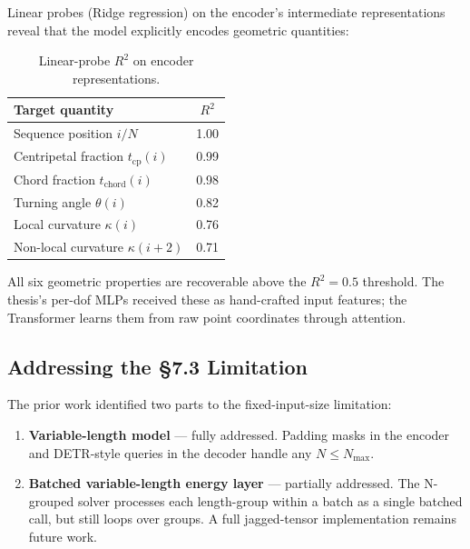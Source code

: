 \documentclass[11pt, a4paper]{article}
\begin{document}
Linear probes (Ridge regression) on the encoder's intermediate
representations reveal that the model explicitly encodes geometric
quantities:

\begin{table}[h]
\centering
\caption{Linear-probe $R^2$ on encoder representations.}
\label{tab:probing}
\begin{tabular}{lc}
\toprule
\textbf{Target quantity} & $R^2$ \\
\midrule
Sequence position $i/N$ & 1.00 \\
Centripetal fraction $t_{\text{cp}}(i)$ & 0.99 \\
Chord fraction $t_{\text{chord}}(i)$ & 0.98 \\
Turning angle $\theta(i)$ & 0.82 \\
Local curvature $\kappa(i)$ & 0.76 \\
Non-local curvature $\kappa(i{+}2)$ & 0.71 \\
\bottomrule
\end{tabular}
\end{table}

All six geometric properties are recoverable above the $R^2 = 0.5$
threshold. The thesis's per-dof MLPs received these as hand-crafted input
features; the Transformer learns them from raw point coordinates through
attention.


\subsection{Addressing the §7.3 Limitation}

The prior work identified two parts to the fixed-input-size limitation:

\begin{enumerate}
  \item \textbf{Variable-length model} --- fully addressed.
        Padding masks in the encoder and DETR-style queries in the decoder
        handle any $N \leq N_{\max}$.
  \item \textbf{Batched variable-length energy layer} --- partially
        addressed.
        The N-grouped solver processes each length-group within a batch as
        a single batched call, but still loops over groups. A full
        jagged-tensor implementation remains future work.
\end{enumerate}


\end{document}
